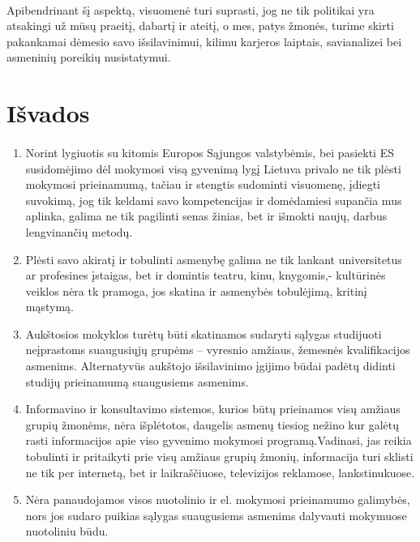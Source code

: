 \documentclass[12pt,a4paper, titlepage]{article}
\begin{document}
\paragraph{}	  
	   Apibendrinant šį aspektą, visuomenė turi suprasti, jog ne tik politikai yra atsakingi už mūsų praeitį, dabartį ir ateitį, o mes, patys žmonės, turime skirti pakankamai dėmesio savo išsilavinimui, kilimu karjeros laiptais, savianalizei bei asmeninių poreikių nusistatymui.
	   
\newpage
\section{Išvados}
\paragraph{}
\begin{enumerate}
\item Norint lygiuotis su kitomis Europos Sąjungos valstybėmis, bei pasiekti ES susidomėjimo  dėl mokymosi visą gyvenimą lygį Lietuva privalo ne tik plėsti mokymosi prieinamumą, tačiau ir stengtis sudominti visuomenę, įdiegti suvokimą, jog tik keldami savo kompetencijas ir domėdamiesi supančia mus aplinka, galima ne tik pagilinti senas žinias, bet ir išmokti naujų, darbus lengvinančių metodų. 
\item Plėsti savo akiratį ir tobulinti asmenybę galima ne tik lankant universitetus ar profesines įstaigas, bet ir domintis teatru, kinu, knygomis,- kultūrinės veiklos nėra tk pramoga, jos skatina ir asmenybės tobulėjimą, kritinį mąstymą. 
\item Aukštosios mokyklos turėtų būti skatinamos sudaryti sąlygas studijuoti neįprastoms suaugusiųjų grupėms – vyresnio amžiaus, žemesnės kvalifikacijos asmenims. Alternatyvūs aukštojo išsilavinimo įgijimo būdai padėtų didinti studijų prieinamumą suaugusiems asmenims.
\item Informavino ir konsultavimo sistemos, kurios būtų prieinamos visų amžiaus grupių žmonėms, nėra išplėtotos, daugelis asmenų tiesiog nežino kur galėtų rasti informacijos apie viso gyvenimo mokymosi programą.Vadinasi, jas reikia tobulinti ir pritaikyti prie visų amžiaus grupių žmonių, informacija turi sklisti ne tik per internetą, bet ir laikraščiuose, televizijos reklamose, lankstinukuose. 
\item Nėra panaudojamos visos nuotolinio ir el. mokymosi prieinamumo galimybės, nors jos sudaro puikias sąlygas suaugusiems asmenims dalyvauti mokymuose nuotoliniu būdu.
\end{enumerate}

\newpage

\nocite{*}
\printbibliography[title={Literatura}]
\end{document}
